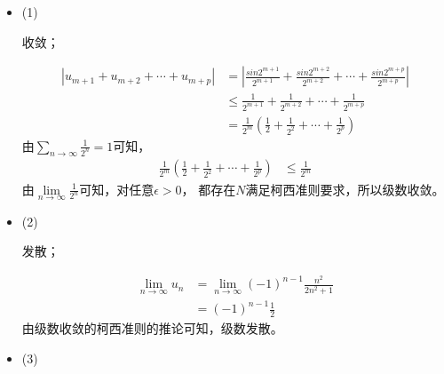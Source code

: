 \documentclass{article}
\begin{document}
\begin{itemize}
  \item (1)

        收敛；

        \begin{align*}
          |u_{m + 1} + u_{m + 2} + \cdots + u_{m + p}|
           & = |\frac{sin 2^{m + 1}}{2^{m + 1}} + \frac{sin 2^{m + 2}}{2^{m + 2}} + \cdots + \frac{sin 2^{m + p}}{2^{m + p}}| \\
           & \leq \frac{1}{2^{m + 1}} + \frac{1}{2^{m + 2}} + \cdots + \frac{1}{2^{m + p}}                                    \\
           & = \frac{1}{2^{m}} \left(\frac{1}{2} + \frac{1}{2^2} + \cdots + \frac{1}{2^p}\right)
        \end{align*}
        由$\sum \limits_{n \to \infty} \frac{1}{2^n} = 1$可知，
        \begin{align*}
          \frac{1}{2^{m}} \left(\frac{1}{2} + \frac{1}{2^2} + \cdots + \frac{1}{2^p}\right)
           & \leq \frac{1}{2^{m}}
        \end{align*}
        由$\lim\limits_{n \to \infty} \frac{1}{2^n}$可知，对任意$\epsilon > 0$，
        都存在$N$满足柯西准则要求，所以级数收敛。

  \item (2)

        发散；

        \begin{align*}
          \lim\limits_{n \to \infty} u_n
           & = \lim\limits_{n \to \infty} (-1)^{n-1} \frac{n^2}{2n^2 + 1} \\
           & = (-1)^{n-1} \frac{1}{2}
        \end{align*}
        由级数收敛的柯西准则的推论可知，级数发散。

  \item (3)


\end{itemize}
\end{document}

